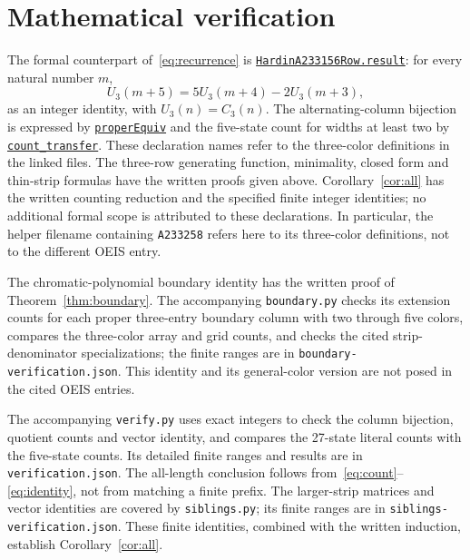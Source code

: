 \documentclass[11pt,a4paper]{article}
\newcommand{\counts}{C}
\begin{document}
\section{Mathematical verification}
The formal counterpart of~\eqref{eq:recurrence} is
\href{https://github.com/the-omega-institute/trureturing/blob/e135d8e2afafffb707a541357df302c35e90baff/D5/S3/Combinatorics/TraceAvoidingArrays/HardinA233156Row.lean}{\texttt{HardinA233156Row.result}}:
for every natural number \(m\),
\[
 U_3(m+5)=5U_3(m+4)-2U_3(m+3),
\]
as an integer identity, with \(U_3(n)=\counts_3(n)\).
The alternating-column bijection is expressed by
\href{https://github.com/the-omega-institute/trureturing/blob/e135d8e2afafffb707a541357df302c35e90baff/D5/S3/Combinatorics/TraceAvoidingArrays/HardinA233155ColumnTransfer.lean}{\texttt{properEquiv}}
and the five-state count for widths at least two by
\href{https://github.com/the-omega-institute/trureturing/blob/e135d8e2afafffb707a541357df302c35e90baff/D5/S3/Combinatorics/TraceAvoidingArrays/HardinA233258PairTransfer.lean}{\texttt{count\_transfer}}.
These declaration names refer to the three-color definitions in the linked
files. The three-row generating function, minimality, closed form and
thin-strip formulas have the written proofs given above.
Corollary~\ref{cor:all} has the written counting reduction and the
specified finite integer identities; no additional formal scope is
attributed to these declarations. In particular, the helper filename
containing \texttt{A233258} refers here to its three-color definitions,
not to the different OEIS entry.

The chromatic-polynomial boundary identity has the written proof of
Theorem~\ref{thm:boundary}. The accompanying \texttt{boundary.py} checks
its extension counts for each proper three-entry boundary column with
two through five colors, compares the three-color array and grid counts,
and checks the cited strip-denominator specializations; the finite
ranges are in \texttt{boundary-verification.json}. This identity and its
general-color version are not posed in the cited OEIS entries.

The accompanying \texttt{verify.py} uses exact integers to check the
column bijection, quotient counts and vector identity, and compares the
27-state literal counts with the five-state counts. Its detailed finite
ranges and results are in \texttt{verification.json}. The all-length
conclusion follows from~\eqref{eq:count}--\eqref{eq:identity}, not from
matching a finite prefix.
The larger-strip matrices and vector identities are covered by
\texttt{siblings.py}; its finite ranges are in
\texttt{siblings-verification.json}. These finite identities, combined
with the written induction, establish Corollary~\ref{cor:all}.
\end{document}
